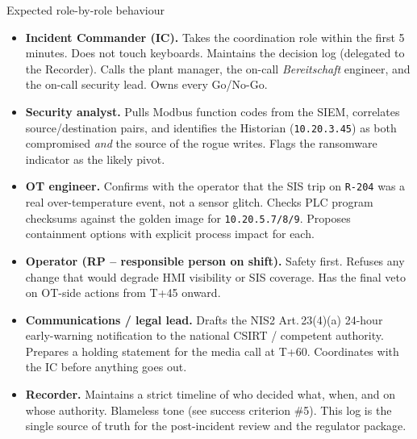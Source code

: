 \documentclass[11pt,a4paper]{article}
\begin{document}
\begin{solutionbox}{Expected role-by-role behaviour}
\begin{itemize}[leftmargin=*, nosep]
  \item \textbf{Incident Commander (IC).} Takes the coordination role
        within the first 5 minutes. Does not touch keyboards.
        Maintains the decision log (delegated to the Recorder). Calls
        the plant manager, the on-call \emph{Bereitschaft} engineer,
        and the on-call security lead. Owns every Go/No-Go.
  \item \textbf{Security analyst.} Pulls Modbus function codes from
        the SIEM, correlates source/destination pairs, and identifies
        the Historian (\texttt{10.20.3.45}) as both compromised
        \emph{and} the source of the rogue writes. Flags the
        ransomware indicator as the likely pivot.
  \item \textbf{OT engineer.} Confirms with the operator that the SIS
        trip on \texttt{R-204} was a real over-temperature event, not
        a sensor glitch. Checks PLC program checksums against the
        golden image for \texttt{10.20.5.7/8/9}. Proposes containment
        options with explicit process impact for each.
  \item \textbf{Operator (RP -- responsible person on shift).} Safety
        first. Refuses any change that would degrade HMI visibility or
        SIS coverage. Has the final veto on OT-side actions from
        T+45 onward.
  \item \textbf{Communications / legal lead.} Drafts the NIS2
        Art.\,23(4)(a) 24-hour early-warning notification to the
        national CSIRT / competent authority. Prepares a holding
        statement for the media call at T+60. Coordinates with the IC
        before anything goes out.
  \item \textbf{Recorder.} Maintains a strict timeline of who decided
        what, when, and on whose authority. Blameless tone (see
        success criterion \#5). This log is the single source of truth
        for the post-incident review and the regulator package.
\end{itemize}
\end{solutionbox}
\end{document}
